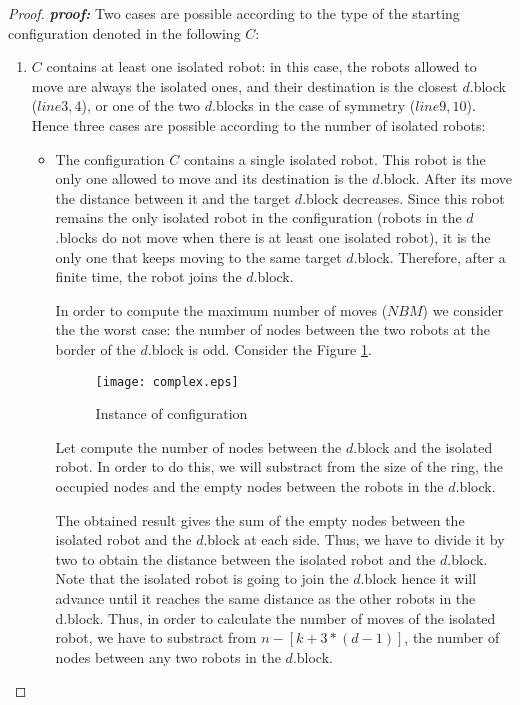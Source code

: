 \documentclass[12pt]{llncs}
\begin{document}
\begin{proof}
\textit{\textbf{proof:}} Two cases are possible according to the type of the starting configuration denoted in the following $C$:
\begin{enumerate}
\item{$C$ contains at least one isolated robot:} 
in this case, the robots allowed to move are always the isolated ones, and their destination is the closest $d$.block ($line 3,4$), or one of the two $d$.blocks in the case of symmetry ($line 9,10$). Hence three cases are possible according to the number of isolated robots:
\begin{itemize}
\item{The configuration $C$ contains a single isolated robot. This robot is the only one allowed to move and its destination is the $d$.block. After its move the distance between it and the target $d$.block decreases. Since this robot remains the only isolated robot in the configuration (robots in the $d$.blocks do not move when there is at least one isolated robot), it is the only one that keeps moving to the same target $d$.block. Therefore, after a finite time, the robot joins the $d$.block. 

In order to compute the maximum number of moves ($NBM$) we consider the 
the worst case: the number of nodes between the two robots at the border of the $d$.block is odd.  
Consider the Figure \ref{fig:case1}.

\begin{figure}[H]
  \centering
  \texttt{[image: complex.eps]}
    \caption{Instance of configuration} 
    \label{fig:case1}
\end{figure}

Let compute the number of nodes between the $d$.block and the isolated robot. In order to do this, we will substract from the size of the ring, the occupied nodes and the empty nodes between the robots in the $d$.block. 


The obtained result gives the sum of the empty nodes between the isolated robot and the $d$.block at each side. Thus, we have to divide it by two to obtain the distance between the isolated robot and the $d$.block. Note that the isolated robot is going to join the $d$.block hence it will advance until it reaches the same distance as the other robots in the d.block. Thus, in order to calculate the number of moves of the isolated robot, we have to substract from $n-[k+3*(d-1)]$, the number of nodes between any two robots in the $d$.block. 






}
\end{itemize}
\end{enumerate}
\end{proof}
\end{document}
